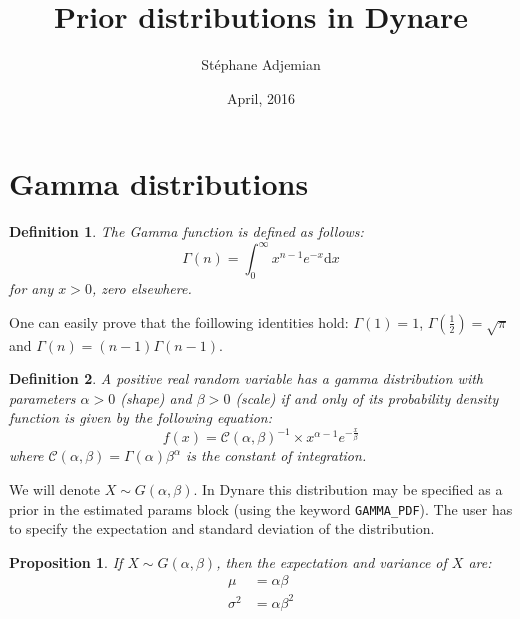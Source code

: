 \documentclass{amsart}
\theoremstyle{plain}
\newtheorem{proposition}{Proposition}[section]
\newtheorem{definition}{Definition}[section]
\theoremstyle{remark}
\numberwithin{equation}{section}
\begin{document}
\title{Prior distributions in Dynare}
\author{Stéphane Adjemian}
\address{Université du Maine}
\date{April, 2016}

\maketitle

\section{Gamma distributions}\label{sec:GammaDistribution}

\begin{definition}
  The Gamma function is defined as follows:
  \[
    \Gamma(n) = \int_0^{\infty}x^{n-1}e^{-x}\mathrm d x
  \]
  for any $x>0$, zero elsewhere.
\end{definition}

One can easily prove that the foillowing identities hold:
$\Gamma(1) = 1$, $\Gamma\left(\frac{1}{2}\right)=\sqrt{\pi}$ and
$\Gamma(n)=(n-1)\Gamma(n-1)$.

\begin{definition}
  A positive real random variable has a gamma distribution with
  parameters $\alpha>0$ (shape) and $\beta>0$ (scale) if and only of
  its probability density function is given by the following equation:
  \[
    f(x)=\mathcal C(\alpha,\beta)^{-1} \times x^{\alpha-1}e^{-\frac{x}{\beta}}
  \]
  where $\mathcal C(\alpha, \beta) = \Gamma(\alpha)\beta^{\alpha}$ is the constant of
  integration.
\end{definition}
 We will denote $X\sim G(\alpha, \beta)$.  In Dynare this
 distribution may be specified as a prior in the estimated params
 block (using the keyword \verb+GAMMA_PDF+). The user has to specify the
 expectation and standard deviation of the distribution.

 \begin{proposition}
   \label{GammaDistributionMoments}
   If $X\sim G(\alpha, \beta)$, then the expectation and variance of $X$ are:
   \[
     \begin{split}
       \mu &= \alpha\beta \\
       \sigma^2 &= \alpha\beta^2
     \end{split}
   \]
 \end{proposition}
\end{document}
